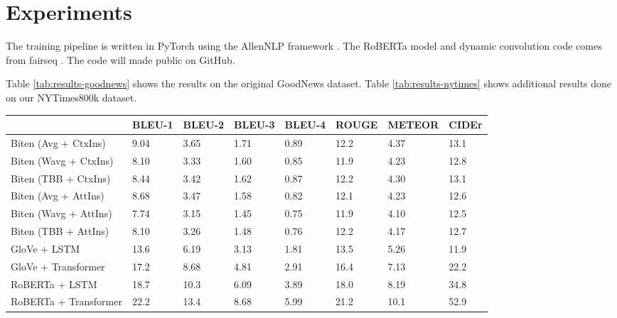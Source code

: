 \documentclass[10pt,twocolumn,letterpaper]{article}
\begin{document}
\begin{figure*}[t]
   \begin{center}
   \fbox{\rule{0pt}{2in} \rule{.9\linewidth}{0pt}}
   \end{center}
      \caption{Overall architecture of the model.}
   \label{fig:short}
   \end{figure*}

\section{Experiments}

The training pipeline is written in PyTorch \cite{Paszke2017Automatic} using
the AllenNLP framework \cite{Gardner2017AllenNLP}. The RoBERTa model and
dynamic convolution code comes from fairseq \cite{Ott2019Fairseq}. The code
will made public on GitHub.

Table \ref{tab:results-goodnews} shows the results on the original GoodNews
dataset. Table \ref{tab:results-nytimes} shows additional results done on
our NYTimes800k dataset.


\begin{table*}[t]
	\caption {Results on the GoodNews dataset}
	\label{tab:results-goodnews}
	\centering
	\begin{tabular}{llllllll}
		\toprule
		 & BLEU-1  & BLEU-2 & BLEU-3 & BLEU-4 & ROUGE & METEOR & CIDEr\\
      \midrule
      Biten (Avg + CtxIns) \cite{Biten2019GoodNews} & 9.04 & 3.65 & 1.71 & 0.89 & 12.2 & 4.37 & 13.1 \\
      Biten (Wavg + CtxIns) \cite{Biten2019GoodNews} & 8.10 & 3.33 & 1.60 & 0.85 & 11.9 & 4.23 & 12.8 \\
      Biten (TBB + CtxIns) \cite{Biten2019GoodNews} & 8.44 & 3.42 & 1.62 & 0.87 & 12.2 & 4.30 & 13.1 \\
      Biten (Avg + AttIns) \cite{Biten2019GoodNews} & 8.68 & 3.47 & 1.58 & 0.82 & 12.1 & 4.23 & 12.6 \\
      Biten (Wavg + AttIns) \cite{Biten2019GoodNews} & 7.74 & 3.15 & 1.45 & 0.75 & 11.9 & 4.10 & 12.5 \\
      Biten (TBB + AttIns) \cite{Biten2019GoodNews} & 8.10 & 3.26 & 1.48 & 0.76 & 12.2 & 4.17 & 12.7 \\
      \midrule
      GloVe + LSTM & 13.6 & 6.19 & 3.13 & 1.81 & 13.5 & 5.26 & 11.9 \\
      GloVe + Transformer & 17.2 & 8.68 & 4.81 & 2.91 & 16.4 & 7.13 & 22.2 \\
      RoBERTa + LSTM & 18.7  & 10.3 & 6.09 & 3.89  & 18.0  & 8.19 & 34.8  \\
      RoBERTa + Transformer & 22.2 & 13.4 & 8.68 & 5.99 & 21.2 & 10.1 & 52.9 \\ %
		\bottomrule
	\end{tabular}
\end{table*}
\end{document}
